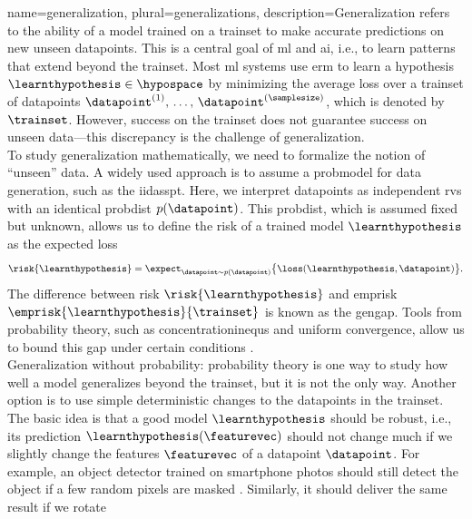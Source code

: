 {name={generalization}, plural={generalizations}, 
	description={Generalization refers to the ability of a \gls{model} trained on a \gls{trainset} to make accurate 
		\glspl{prediction} on new unseen \glspl{datapoint}. This is a central goal of \gls{ml} and \gls{ai}, i.e., 
		to learn patterns that extend beyond the \gls{trainset}. Most \gls{ml} systems 
		use \gls{erm} to learn a \gls{hypothesis} $\learnthypothesis \in \hypospace$ by minimizing 
		the average \gls{loss} over a \gls{trainset} of \glspl{datapoint} $\datapoint^{(1)}, \,\ldots, \,\datapoint^{(\samplesize)}$, 
		which is denoted by $\trainset$. However, success on the \gls{trainset} does not guarantee success on 
		unseen \gls{data}—this discrepancy is the challenge of generalization. \\ To study generalization 
		mathematically, we need to formalize the notion of ``unseen'' \gls{data}. A widely used 
		approach is to assume a \gls{probmodel} for \gls{data} generation, such as the \gls{iidasspt}. 
		Here, we interpret \glspl{datapoint} as independent \glspl{rv} with an identical 
		\gls{probdist} $p(\datapoint)$. This \gls{probdist}, which is assumed fixed but unknown, 
		allows us to define the \gls{risk} of a trained \gls{model} $\learnthypothesis$ as the expected \gls{loss}
		\[
		\risk{\learnthypothesis}=\expect_{\datapoint \sim p(\datapoint)} \big\{ \loss(\learnthypothesis, \datapoint) \big\}.
		\]
		The difference between \gls{risk} $\risk{\learnthypothesis}$ and \gls{emprisk} $\emprisk{\learnthypothesis}{\trainset}$ 
		is known as the \gls{gengap}. Tools from \gls{probability} theory, such as \glspl{concentrationinequ} 
		and uniform \gls{convergence}, allow us to bound this gap under certain conditions \cite{ShalevMLBook}.\\
		Generalization without \gls{probability}: \Gls{probability} theory is one way to study how well a 
		\gls{model} generalizes beyond the \gls{trainset}, but it is not the only way. Another option is to use 
		simple deterministic changes to the \glspl{datapoint} in the \gls{trainset}. The basic idea is that a 
		good \gls{model} $\learnthypothesis$ should be robust, i.e., its \gls{prediction} $\learnthypothesis(\featurevec)$ 
		should not change much if we slightly change the \glspl{feature} $\featurevec$ of a \gls{datapoint} $\datapoint$. 
		For example, an object detector trained on smartphone photos should still detect the object if a few 
		random pixels are masked \cite{OnePixelAttack}. Similarly, it should deliver the same result if we rotate 
}}

